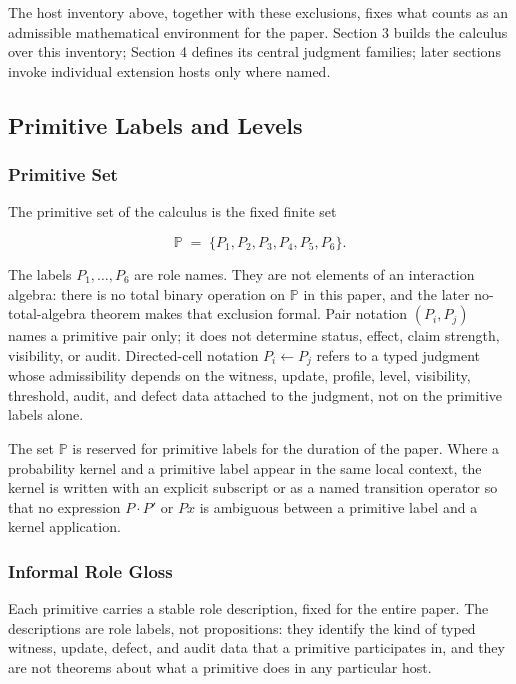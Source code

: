 \documentclass[11pt]{article}
\theoremstyle{definition}
\begin{document}
The host inventory above, together with these exclusions, fixes what counts as an admissible mathematical environment for the paper. Section 3 builds the calculus over this inventory; Section 4 defines its central judgment families; later sections invoke individual extension hosts only where named.

\subsection{Primitive Labels and Levels}

\subsubsection{Primitive Set}

The primitive set of the calculus is the fixed finite set

\[
\mathbb P \;=\; \{P_1,P_2,P_3,P_4,P_5,P_6\}.
\]

The labels \(P_1,\ldots,P_6\) are role names. They are not elements of an interaction algebra: there is no total binary operation on \(\mathbb P\) in this paper, and the later no-total-algebra theorem makes that exclusion formal. Pair notation \((P_i,P_j)\) names a primitive pair only; it does not determine status, effect, claim strength, visibility, or audit. Directed-cell notation \(P_i\leftarrow P_j\) refers to a typed judgment whose admissibility depends on the witness, update, profile, level, visibility, threshold, audit, and defect data attached to the judgment, not on the primitive labels alone.

The set \(\mathbb P\) is reserved for primitive labels for the duration of the paper. Where a probability kernel and a primitive label appear in the same local context, the kernel is written with an explicit subscript or as a named transition operator so that no expression \(P\cdot P'\) or \(Px\) is ambiguous between a primitive label and a kernel application.

\subsubsection{Informal Role Gloss}

Each primitive carries a stable role description, fixed for the entire paper. The descriptions are role labels, not propositions: they identify the kind of typed witness, update, defect, and audit data that a primitive participates in, and they are not theorems about what a primitive does in any particular host.
\end{document}
